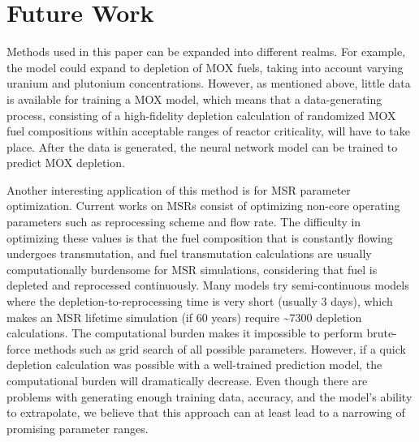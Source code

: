 \section{Future Work}

Methods used in this paper can be expanded into different
realms. For example, the model
could expand to depletion of \gls{MOX} fuels, taking
into account varying uranium and plutonium concentrations.
However, as mentioned above, little data is available
for training a \gls{MOX} model, which means that a
data-generating process, consisting of a high-fidelity
depletion calculation of randomized \gls{MOX} fuel
compositions within acceptable ranges of reactor
criticality, will have to take place. After the data
is generated, the neural network model can be trained
to predict \gls{MOX} depletion.

Another interesting application of this method is for
\gls{MSR} parameter optimization. Current works on
\glspl{MSR} consist of optimizing non-core operating
parameters such as reprocessing scheme and flow rate.
The difficulty in optimizing these values is that the
fuel composition that is constantly flowing undergoes
transmutation, and fuel transmutation calculations
are usually computationally burdensome for \gls{MSR}
simulations, considering that fuel is depleted and
reprocessed continuously. Many models try semi-continuous
models where the depletion-to-reprocessing time is
very short (usually 3 days), which makes an
\gls{MSR} lifetime simulation (if 60 years)
require \textasciitilde 7300 depletion calculations.
The computational burden
makes it impossible to perform brute-force methods
such as grid search of all possible parameters.
However, if a quick depletion calculation was possible
with a well-trained prediction model, the
computational burden will dramatically decrease.
Even though there are problems with generating enough
training data, accuracy, and the model's ability to
extrapolate, we believe that this approach can
at least lead to a narrowing of promising parameter
ranges.
